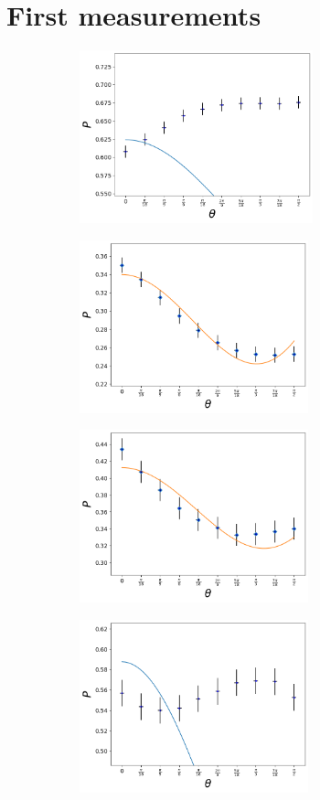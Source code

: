 \documentclass[12pt]{book}
\begin{document}
\section{First measurements}

\begin{figure}[t!]
\centering
\begin{subfigure}[b]{0.45\linewidth}
\includegraphics[width=\linewidth,height=5cm]{images/ajuste_miercoles_11.png}
\caption{}
\end{subfigure}
\begin{subfigure}[b]{0.45\linewidth}
\includegraphics[width=\linewidth,height=5cm]{images/ajuste_miercoles_21.png}
\caption{}
\end{subfigure}
\begin{subfigure}[b]{0.45\linewidth}
\includegraphics[width=\linewidth,height=5cm]{images/ajuste_miercoles_12.png}
\caption{}
\end{subfigure}
\begin{subfigure}[b]{0.45\linewidth}
\includegraphics[width=\linewidth,height=5cm]{images/ajuste_miercoles_22.png}

\end{subfigure}
\end{figure}
\end{document}
